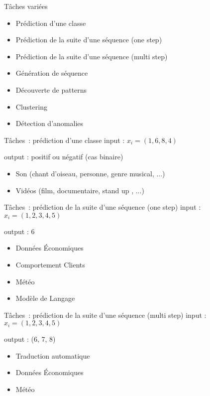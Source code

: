 \begin{frame}{Tâches variées}
  \begin{itemize}[<+->]
    \item Prédiction d'une classe
    \item Prédiction de la suite d'une séquence (one step)
    \item Prédiction de la suite d'une séquence (multi step)
    \item Génération de séquence
    \item Découverte de patterns
    \item Clustering
    \item Détection d'anomalies
  \end{itemize}
\end{frame}

\begin{frame}{Tâches~: prédiction d'une classe}
  input : $x_i=(1,6,8,4)$

  output : positif ou négatif (cas binaire)

  \begin{itemize}[<+->]
    \item Son (chant d'oiseau, personne, genre musical, ...)
    \item Vidéos (film, documentaire, stand up , ...)
  \end{itemize}
\end{frame}

\begin{frame}{Tâches~: prédiction de la suite d'une séquence (one step)}
  input : $x_i=(1,2,3,4,5)$

  output : 6

  \begin{itemize}[<+->]
    \item Données Économiques
    \item Comportement Clients
    \item Météo
    \item Modèle de Langage
  \end{itemize}
\end{frame}

\begin{frame}{Tâches~: prédiction de la suite d'une séquence (multi step)}
  input : $x_i=(1,2,3,4,5)$

  output : (6, 7, 8)

  \begin{itemize}[<+->]
    \item Traduction automatique
    \item Données Économiques
    \item Météo
  \end{itemize}
\end{frame}


